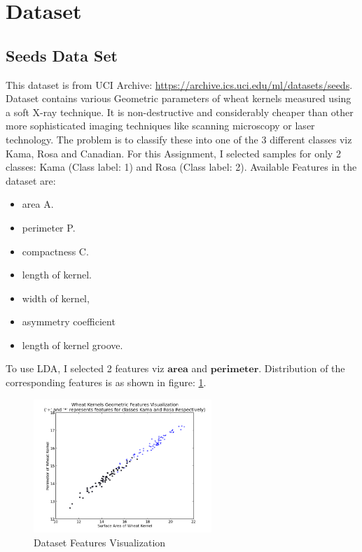 \documentclass[11pt, pdftex]{article}
\title{Assignment (MiniProject) #2}
\author{Machiry Aravind Kumar}
\date{UCSB}
\begin{document}
\maketitle
\section{Dataset}
\subsection{Seeds Data Set}
This dataset is from UCI Archive: \url{https://archive.ics.uci.edu/ml/datasets/seeds}. Dataset contains various Geometric parameters of wheat kernels measured using a soft X-ray technique. It is non-destructive and considerably cheaper than other more sophisticated imaging techniques like scanning microscopy or laser technology. The problem is to classify these into one of the 3 different classes viz  Kama, Rosa and Canadian. For this Assignment, I selected samples for only 2 classes: Kama (Class label: 1) and Rosa (Class label: 2). Available Features in the dataset are:
\begin{itemize}
\item area A.
\item perimeter P.
\item compactness C.
\item length of kernel.
\item width of kernel,
\item asymmetry coefficient
\item length of kernel groove.
\end{itemize}
To use LDA, I selected 2 features viz $\textbf{area}$ and $\textbf{perimeter}$. Distribution of the corresponding features is as shown in figure: \ref{fig:seeds}.

\begin{figure}
    \centering
    \includegraphics[width=0.6\textwidth]{pics/FeaturesVisualization.png} 
    \caption{Dataset Features Visualization}
    \label{fig:seeds}
\end{figure}
\end{document}
